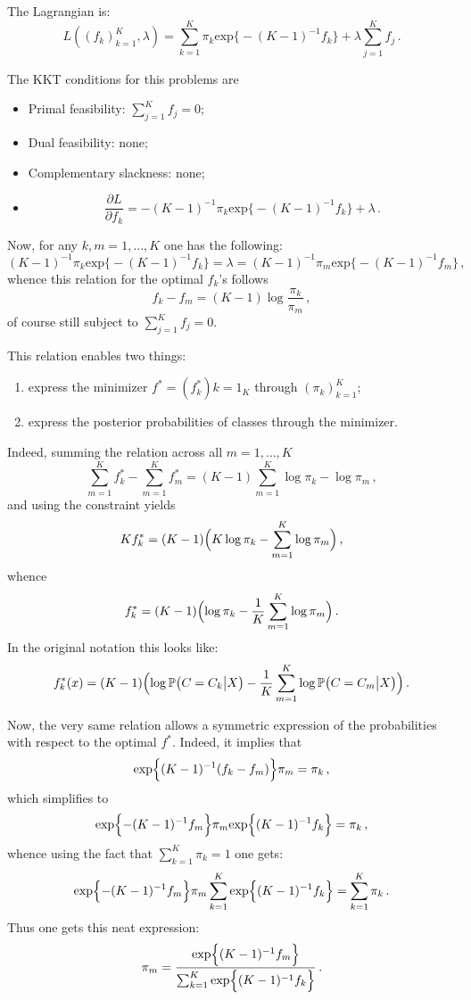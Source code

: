 \documentclass[a4paper]{article}
\newcommand{\pr}{\mathbb{P}}
\begin{document}
The Lagrangian is:
\[
L((f_k)_{k=1}^K, \lambda)
= \sum_{k=1}^K \pi_k \text{exp}\bigl\{ -(K-1)^{-1} f_k \bigr\} + \lambda \sum_{j=1}^K f_j\,.
\]

The KKT conditions for this problems are \begin{itemize}
	\item Primal feasibility: $\sum_{j=1}^K f_j = 0$;
	\item Dual feasibility: none;
	\item Complementary slackness: none;
	\item
	\[
	\frac{\partial L}{\partial f_k}
		= -(K-1)^{-1} \pi_k \text{exp}\bigl\{ -(K-1)^{-1} f_k \bigr\} + \lambda
	\,. \]
\end{itemize}
Now, for any $k,m=1,\ldots,K$ one has the following:
\[
(K-1)^{-1} \pi_k \text{exp}\bigl\{ -(K-1)^{-1} f_k \bigr\}
= \lambda
= (K-1)^{-1} \pi_m \text{exp}\bigl\{ -(K-1)^{-1} f_m \bigr\}\,,
\]
whence this relation for the optimal $f_k$'s follows
\[ f_k - f_m = (K-1)\log\frac{\pi_k}{\pi_m} \,, \]
of course still subject to $\sum_{j=1}^K f_j = 0$.

This relation enables two things: \begin{enumerate}
	\item express the minimizer $f^* = (f^*_k){k=1}_K$ through $(\pi_k)_{k=1}^K$;
	\item express the posterior probabilities of classes through the minimizer.
\end{enumerate}
Indeed, summing the relation across all $m=1,\ldots,K$ 
\[ \sum_{m=1}^K f^*_k - \sum_{m=1}^K f^*_m = (K-1)\sum_{m=1}^K \log \pi_k - \log \pi_m\,, \]
and using the constraint yields
\[ K f^*_k = (K-1) \Bigl( K \log \pi_k - \sum_{m=1}^K \log \pi_m \Bigr)\,, \]
whence
\[ f^*_k = (K-1) \Bigl( \log \pi_k - \frac{1}{K}\sum_{m=1}^K \log \pi_m \Bigr)\,. \]
In the original notation this looks like:
\[
f^*_k(x)
= (K-1) \Bigl( \log \pr\bigl( C = C_k \big\vert X \bigr)
	- \frac{1}{K}\sum_{m=1}^K \log \pr\bigl( C = C_m \big\vert X \bigr) \Bigr)
\,.\]

Now, the very same relation allows a symmetric expression of the probabilities
with respect to the optimal $f^*$. Indeed, it implies that 
\[ \text{exp}\Bigl\{ (K-1)^{-1}(f_k - f_m) \Bigr\}\pi_m = \pi_k \,, \]
which simplifies to
\[ \text{exp}\Bigl\{ -(K-1)^{-1}f_m \Bigr\} \pi_m \text{exp}\Bigl\{ (K-1)^{-1}f_k \Bigr\} = \pi_k \,, \]
whence using the fact that $\sum_{k=1}^K \pi_k = 1$ one gets:
\[
\text{exp}\Bigl\{ -(K-1)^{-1}f_m \Bigr\} \pi_m
	\sum_{k=1}^K \text{exp}\Bigl\{ (K-1)^{-1}f_k \Bigr\} = \sum_{k=1}^K \pi_k \,.
\]
Thus one gets this neat expression:
\[
\pi_m = \frac{\text{exp}\Bigl\{ (K-1)^{-1}f_m \Bigr\} }{
	\sum_{k=1}^K \text{exp}\Bigl\{ (K-1)^{-1}f_k \Bigr\}} \,.
\]
\end{document}
